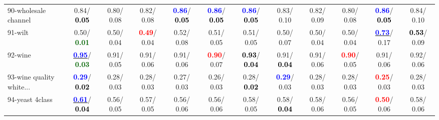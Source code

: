 \begin{table}[h]
\begin{center}
{\begin{tabular}{lc|c|c|c|c|c|c|c|c|c|c}
90-wholesale channel &   0.84/\textcolor{black}{\textbf{  0.05}} &   0.80/  0.08 &   0.82/  0.08 & \textcolor{blue}{\textbf{  0.86}}/\textcolor{black}{\textbf{  0.05}} & \textcolor{blue}{\textbf{  0.86}}/\textcolor{black}{\textbf{  0.05}} & \textcolor{blue}{\textbf{  0.86}}/\textcolor{black}{\textbf{  0.05}} &   0.83/  0.10 &   0.82/  0.09 &   0.80/  0.08 & \textcolor{blue}{\textbf{  0.86}}/\textcolor{black}{\textbf{  0.05}} &   0.84/  0.10 \\
91-wilt &   0.50/\textcolor{darkgreen}{\textbf{  0.01}} &   0.50/  0.04 & \textcolor{red}{\textbf{  0.49}}/  0.04 &   0.52/  0.08 &   0.51/  0.05 &   0.51/  0.05 &   0.50/  0.07 &   0.50/  0.04 &   0.50/  0.04 & \underline{\textcolor{blue}{\textbf{  0.73}}}/  0.17 & \textcolor{black}{\textbf{  0.53}}/  0.09 \\
92-wine & \underline{\textcolor{blue}{\textbf{  0.95}}}/\textcolor{darkgreen}{\textbf{  0.03}} &   0.91/  0.05 &   0.91/  0.06 &   0.91/  0.06 & \textcolor{red}{\textbf{  0.90}}/  0.07 & \textcolor{black}{\textbf{  0.93}}/\textcolor{black}{\textbf{  0.04}} &   0.91/\textcolor{black}{\textbf{  0.04}} &   0.91/  0.06 & \textcolor{red}{\textbf{  0.90}}/  0.05 &   0.91/  0.06 &   0.92/  0.06 \\ \hline
93-wine quality white... & \textcolor{blue}{\textbf{  0.29}}/\textcolor{black}{\textbf{  0.02}} &   0.28/  0.03 &   0.28/  0.03 &   0.27/  0.03 &   0.26/  0.03 &   0.28/\textcolor{black}{\textbf{  0.02}} & \textcolor{blue}{\textbf{  0.29}}/  0.03 &   0.28/  0.03 &   0.28/  0.03 & \textcolor{red}{\textbf{  0.25}}/  0.03 &   0.28/  0.03 \\
94-yeast 4class & \underline{\textcolor{blue}{\textbf{  0.61}}}/\textcolor{black}{\textbf{  0.04}} &   0.56/  0.05 &   0.57/  0.05 &   0.56/  0.06 &   0.56/  0.06 &   0.58/  0.05 &   0.58/\textcolor{black}{\textbf{  0.04}} &   0.58/  0.06 &   0.56/  0.05 & \textcolor{red}{\textbf{  0.50}}/  0.06 &   0.58/  0.06 \\\end{tabular}}\label{stratsBalAcc2aIELM}
\end{center}
\end{table}
